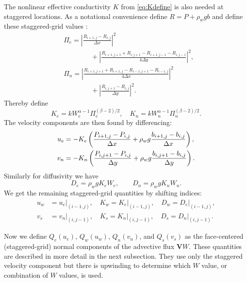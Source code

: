 \documentclass[gmd]{copernicus}   %
\newcommand\bV{\mathbf{V}}
\begin{document}
The nonlinear effective conductivity $K$ from \eqref{eq:Kdefine} is also needed at staggered locations.  As a notational convenience define $R=P+\rho_w g b$ and define these staggered-grid values \citep[compare][]{Mahaffy}:
\begin{align*}
&\Pi_e = \left|\frac{R_{i+1,j}-R_{i,j}}{\Delta x}\right|^2 \\
&\qquad \qquad + \left|\frac{R_{i+1,j+1}+R_{i,j+1} - R_{i+1,j-1}-R_{i,j-1}}{4\Delta y}\right|^2, \\
&\Pi_n = \left|\frac{R_{i+1,j+1}+R_{i+1,j} - R_{i-1,j+1}-R_{i-1,j}}{4\Delta x}\right|^2 \\
&\qquad \qquad + \left|\frac{R_{i,j+1}-R_{i,j}}{\Delta y}\right|^2.
\end{align*}
Thereby define
\begin{equation}
K_e = k W_e^{\alpha-1} \Pi_e^{(\beta-2)/2}, \quad K_n = k W_n^{\alpha-1} \Pi_n^{(\beta-2)/2}.  \label{eq:stagK}
\end{equation}
The velocity components are then found by differencing:
\begin{align}
u_e &= - K_e \left(\frac{P_{i+1,j}-P_{i,j}}{\Delta x} + \rho_w g \frac{b_{i+1,j}-b_{i,j}}{\Delta x}\right),  \label{eq:velocitycomp} \\
v_n &= - K_n \left(\frac{P_{i,j+1}-P_{i,j}}{\Delta y} + \rho_w g \frac{b_{i,j+1}-b_{i,j}}{\Delta y}\right). \notag
\end{align}
Similarly for diffusivity we have
\begin{equation}
D_e = \rho_w g K_e W_e, \qquad D_n = \rho_w g K_n W_n.  \label{eq:diffusivitycomp}
\end{equation}
We get the remaining staggered-grid quantities by shifting indices:
\begin{align*}
u_w &= u_e\big|_{(i-1,j)}, \quad K_w = K_e\big|_{(i-1,j)}, \quad D_w = D_e\big|_{(i-1,j)}, \\
v_s &= v_n\big|_{(i,j-1)}, \quad K_s = K_n\big|_{(i,j-1)}, \quad D_s = D_n\big|_{(i,j-1)}.
\end{align*}

Now we define $Q_e(u_e)$, $Q_w(u_w)$, $Q_n(v_n)$, and $Q_s(v_s)$ as the face-centered (staggered-grid) normal components of the advective flux $\bV W$.  These quantities are described in more detail in the next subsection.  They use only the staggered velocity component but there is upwinding to determine which $W$ value, or combination of $W$ values, is used.
\end{document}
